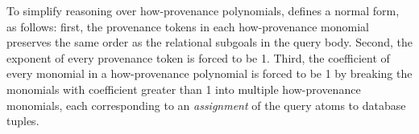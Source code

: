 To simplify reasoning over how-provenance polynomials, \cite{amsterdamer2012provenance} defines a normal form, as follows: first, the provenance tokens in each how-provenance monomial preserves the same order as the relational subgoals in the query body. Second, the exponent of every provenance token is forced to be 1. Third, the coefficient of every monomial in a how-provenance polynomial is forced to be 1 by breaking the monomials with coefficient greater than 1 into multiple how-provenance monomials, each corresponding to an {\em assignment} of the query atoms to database tuples.
